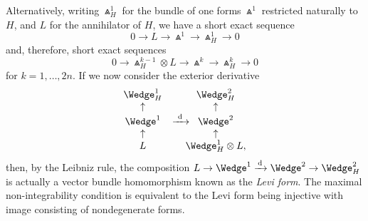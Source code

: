 \documentclass[10pt,a4paper]{amsart}
\numberwithin{equation}{section}
\begin{document}
Alternatively, writing $\Wedge_H^1$ for the bundle of one
forms $\Wedge^1$ restricted naturally to $H$, and $L$ for the annihilator of
$H$, we have a short exact sequence
\begin{equation*}%
0\to L\to\Wedge^1\to\Wedge_H^1\to 0
\end{equation*}
and, therefore, short exact sequences
\begin{equation}\label{SES2}
0\to \Wedge_H^{k-1}\otimes L\to\Wedge^k\to\Wedge_H^k\to 0\end{equation}
for $k=1,\ldots,2n$.
If we now consider the exterior derivative
\[\begin{array}{ccc}\Wedge_H^1&&\Wedge_H^2\\ \uparrow&&\uparrow\\
\Wedge^1&\xrightarrow{\ {\rm d}\ }\hspace{-14pt}
&\Wedge^2\\ \uparrow&&\uparrow\\
L&&\Wedge_H^1\otimes L,
\end{array}\]
then, by the Leibniz rule, the composition
$L\to\Wedge^1\xrightarrow{\,{\rm d}\,}\Wedge^2\to\Wedge_H^2$ is actually a vector
bundle homomorphism
known as the {\em Levi form}. The maximal non-integrability condition is
equivalent to the Levi form being injective with image consisting of
nondegenerate forms.
\end{document}
